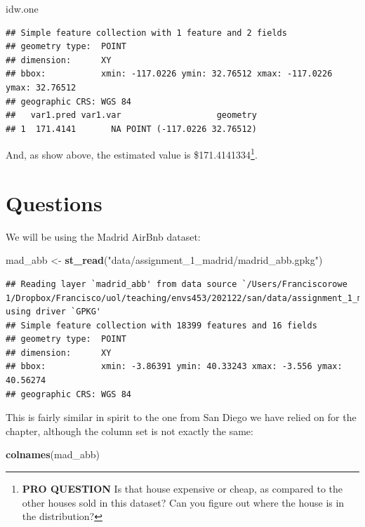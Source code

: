 \documentclass[
]{book}
\newenvironment{Shaded}{\begin{snugshade}}{\end{snugshade}}
\newcommand{\KeywordTok}[1]{\textcolor[rgb]{0.13,0.29,0.53}{\textbf{#1}}}
\newcommand{\NormalTok}[1]{#1}
\newcommand{\StringTok}[1]{\textcolor[rgb]{0.31,0.60,0.02}{#1}}
\begin{document}
\begin{Shaded}
\begin{Highlighting}[]
\NormalTok{idw.one}
\end{Highlighting}
\end{Shaded}

\begin{verbatim}
## Simple feature collection with 1 feature and 2 fields
## geometry type:  POINT
## dimension:      XY
## bbox:           xmin: -117.0226 ymin: 32.76512 xmax: -117.0226 ymax: 32.76512
## geographic CRS: WGS 84
##   var1.pred var1.var                   geometry
## 1  171.4141       NA POINT (-117.0226 32.76512)
\end{verbatim}

And, as show above, the estimated value is \$171.4141334\footnote{\textbf{PRO QUESTION} Is that house expensive or cheap, as compared to the other houses sold in this dataset? Can you figure out where the house is in the distribution?}.

\hypertarget{questions}{%
\section{Questions}\label{questions}}

We will be using the Madrid AirBnb dataset:

\begin{Shaded}
\begin{Highlighting}[]
\NormalTok{mad_abb <-}\StringTok{ }\KeywordTok{st_read}\NormalTok{(}\StringTok{"data/assignment_1_madrid/madrid_abb.gpkg"}\NormalTok{)}
\end{Highlighting}
\end{Shaded}

\begin{verbatim}
## Reading layer `madrid_abb' from data source `/Users/Franciscorowe 1/Dropbox/Francisco/uol/teaching/envs453/202122/san/data/assignment_1_madrid/madrid_abb.gpkg' using driver `GPKG'
## Simple feature collection with 18399 features and 16 fields
## geometry type:  POINT
## dimension:      XY
## bbox:           xmin: -3.86391 ymin: 40.33243 xmax: -3.556 ymax: 40.56274
## geographic CRS: WGS 84
\end{verbatim}

This is fairly similar in spirit to the one from San Diego we have relied on for the chapter, although the column set is not exactly the same:

\begin{Shaded}
\begin{Highlighting}[]
\KeywordTok{colnames}\NormalTok{(mad_abb)}
\end{Highlighting}
\end{Shaded}
\end{document}
